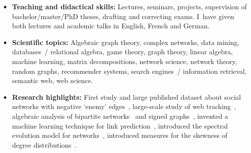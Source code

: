 \documentclass[line,mm]{res}
\newcounter{x}
\newcounter{y}
\newcounter{z}
\begin{document}
\begin{resume}
\begin{itemize}
  \item \textbf{Teaching and didactical skills:}
    Lectures, seminars, projects, supervision of bachelor/master/PhD theses,
    drafting and correcting exams.
    I~have given both lectures and academic talks in English, French and
    German.
  \item \textbf{Scientific topics:}
    Algebraic graph theory,
    complex networks,
    data mining,
    databases~/ relational algebra,
    game theory,
    graph theory,
    linear algebra,
    machine learning,
    matrix decompositions,
    network science, network theory,
    random graphs,
    recommender systems,
    search engines~/ information retrieval,
    semantic web,
    web science.
  \item \textbf{Research highlights:}
    First study and large published dataset about social networks with negative `enemy'
    edges~, 
    large-scale study of web tracking~,
    algebraic analysis of bipartite networks~ and
    signed graphs~,
    invented a machine learning technique for link
    prediction~,
    introduced the spectral evolution model for networks~,
    introduced measures for the skewness of degree distributions~.
\end{itemize}

\iffalse

\end{resume}
\end{document}
